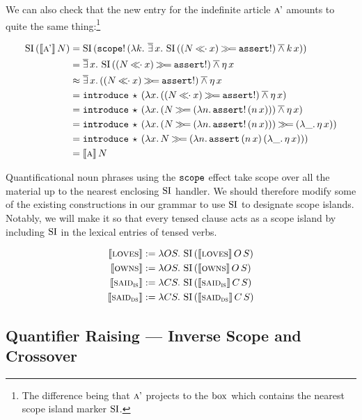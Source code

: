 We can also check that the new entry for the indefinite article $\textsc{a'}$
amounts to quite the same thing:\footnote{The difference being that
  $\textsc{a'}$ projects to the $\mathrm{box}$ which contains the nearest scope island
  marker $\operatorname{SI}$.}

\begin{align*}
\ap{\SI}{(\ap{\sem{\abs{a'}}}{N})}
&= \ap{\SI}{(\ap{\op{scope}!}{(\lam{k}{\dexists x.\,\ap{\SI}{((N \apl x) \hsbind \op{assert}!)} \dand \ap{k}{x}})})} \\
&= \dexists x.\,\ap{\SI}{((N \apl x) \hsbind \op{assert}!)} \dand \etaE{x} \\
&\approx \dexists x.\,((N \apl x) \hsbind \op{assert}!) \dand \etaE{x} \\
&= \app{\op{introduce}}{\star}{(\lam{x}{((N \apl x) \hsbind \op{assert}!) \dand \etaE{x}})} \\
&= \app{\op{introduce}}{\star}{(\lam{x}{(N \hsbind (\lam{n}{\ap{\op{assert}!}{(\ap{n}{x})}})) \dand \etaE{x}})} \\
&= \app{\op{introduce}}{\star}{(\lam{x}{(N \hsbind (\lam{n}{\ap{\op{assert}!}{(\ap{n}{x})}})) \hsbind (\lam{\_}{\etaE{x}})})} \\
&= \app{\op{introduce}}{\star}{(\lam{x}{N \hsbind (\lam{n}{\app{\op{assert}}{(\ap{n}{x})}{(\lam{\_}{\etaE{x}})}})})} \\
&= \ap{\sem{\abs{a}}}{N}
\end{align*}

Quantificational noun phrases using the $\mathtt{scope}$ effect take scope over
all the material up to the nearest enclosing $\operatorname{SI}$ handler. We should
therefore modify some of the existing constructions in our grammar to use
$\operatorname{SI}$ to designate scope islands. Notably, we will make it so that every
tensed clause acts as a scope island by including $\operatorname{SI}$ in the lexical
entries of tensed verbs.

\begin{align*}
  \llbracket \textsc{loves} \rrbracket &:= \lambda O S.\, \operatorname{SI}\,(\llbracket \textsc{loves} \rrbracket\,O\,S) \\
  \llbracket \textsc{owns} \rrbracket &:= \lambda O S.\, \operatorname{SI}\,(\llbracket \textsc{owns} \rrbracket\,O\,S) \\
  \llbracket \textsc{said}_{\textsc{is}} \rrbracket &:= \lambda C S.\, \operatorname{SI}\,(\llbracket \textsc{said}_{\textsc{is}} \rrbracket\,C\,S) \\
  \llbracket \textsc{said}_{\textsc{ds}} \rrbracket &:= \lambda C S.\, \operatorname{SI}\,(\llbracket \textsc{said}_{\textsc{ds}} \rrbracket\,C\,S)
\end{align*}


\subsection{Quantifier Raising --- Inverse Scope and Crossover}
\label{ssec:crossover}


